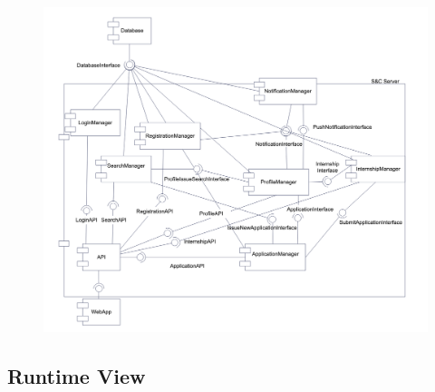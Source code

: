 \newpage
\begin{figure}[h!]
        \centering  \includegraphics[width=1\textwidth]{DD/Images/CD.png}
        \label{fig:ComponentViewDiagram}
\end{figure}
\newpage

\newpage
\subsection{Runtime View}

